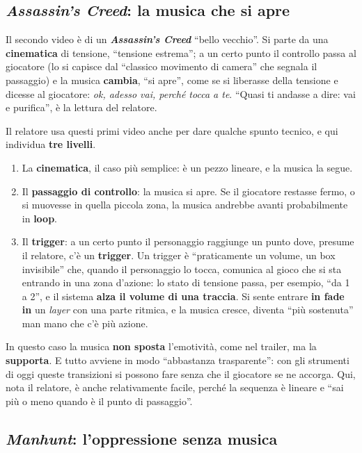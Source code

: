 \subsection{\emph{Assassin's Creed}: la musica che si apre}

Il secondo video è di un \textbf{\emph{Assassin's Creed}} ``bello vecchio''. Si
parte da una \textbf{cinematica} di tensione, ``tensione estrema''; a un certo
punto il controllo passa al giocatore (lo si capisce dal ``classico movimento di
camera'' che segnala il passaggio) e la musica \textbf{cambia}, ``si apre'', come
se si liberasse della tensione e dicesse al giocatore: \emph{ok, adesso vai,
perché tocca a te}. ``Quasi ti andasse a dire: vai e purifica'', è la lettura
del relatore.

Il relatore usa questi primi video anche per dare qualche spunto tecnico, e qui
individua \textbf{tre livelli}.
\begin{enumerate}
  \item La \textbf{cinematica}, il caso più semplice: è un pezzo lineare, e la
        musica la segue.
  \item Il \textbf{passaggio di controllo}: la musica si apre. Se il giocatore
        restasse fermo, o si muovesse in quella piccola zona, la musica
        andrebbe avanti probabilmente in \textbf{loop}.
  \item Il \textbf{trigger}: a un certo punto il personaggio raggiunge un punto
        dove, presume il relatore, c'è un \textbf{trigger}. Un trigger è
        ``praticamente un volume, un box invisibile'' che, quando il personaggio
        lo tocca, comunica al gioco che si sta entrando in una zona d'azione: lo
        stato di tensione passa, per esempio, ``da 1 a 2'', e il sistema
        \textbf{alza il volume di una traccia}. Si sente entrare \textbf{in fade
        in} un \emph{layer} con una parte ritmica, e la musica cresce, diventa
        ``più sostenuta'' man mano che c'è più azione.
\end{enumerate}

In questo caso la musica \textbf{non sposta} l'emotività, come nel trailer, ma
la \textbf{supporta}. E tutto avviene in modo ``abbastanza trasparente'': con gli
strumenti di oggi queste transizioni si possono fare senza che il giocatore se ne
accorga. Qui, nota il relatore, è anche relativamente facile, perché la sequenza
è lineare e ``sai più o meno quando è il punto di passaggio''.

\subsection{\emph{Manhunt}: l'oppressione senza musica}

